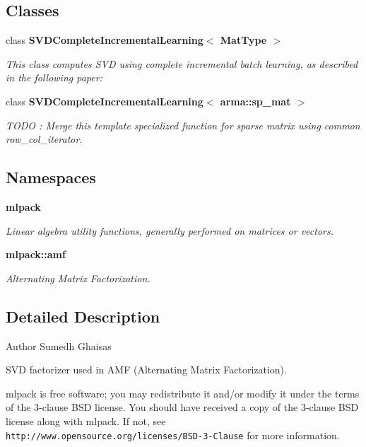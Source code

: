 \subsection*{Classes}
\begin{DoxyCompactItemize}
\item 
class \textbf{ S\+V\+D\+Complete\+Incremental\+Learning$<$ Mat\+Type $>$}
\begin{DoxyCompactList}\small\item\em This class computes S\+VD using complete incremental batch learning, as described in the following paper\+: \end{DoxyCompactList}\item 
class \textbf{ S\+V\+D\+Complete\+Incremental\+Learning$<$ arma\+::sp\+\_\+mat $>$}
\begin{DoxyCompactList}\small\item\em T\+O\+DO \+: Merge this template specialized function for sparse matrix using common row\+\_\+col\+\_\+iterator. \end{DoxyCompactList}\end{DoxyCompactItemize}
\subsection*{Namespaces}
\begin{DoxyCompactItemize}
\item 
 \textbf{ mlpack}
\begin{DoxyCompactList}\small\item\em Linear algebra utility functions, generally performed on matrices or vectors. \end{DoxyCompactList}\item 
 \textbf{ mlpack\+::amf}
\begin{DoxyCompactList}\small\item\em Alternating Matrix Factorization. \end{DoxyCompactList}\end{DoxyCompactItemize}


\subsection{Detailed Description}
\begin{DoxyAuthor}{Author}
Sumedh Ghaisas
\end{DoxyAuthor}
S\+VD factorizer used in A\+MF (Alternating Matrix Factorization).

mlpack is free software; you may redistribute it and/or modify it under the terms of the 3-\/clause B\+SD license. You should have received a copy of the 3-\/clause B\+SD license along with mlpack. If not, see {\tt http\+://www.\+opensource.\+org/licenses/\+B\+S\+D-\/3-\/\+Clause} for more information. 